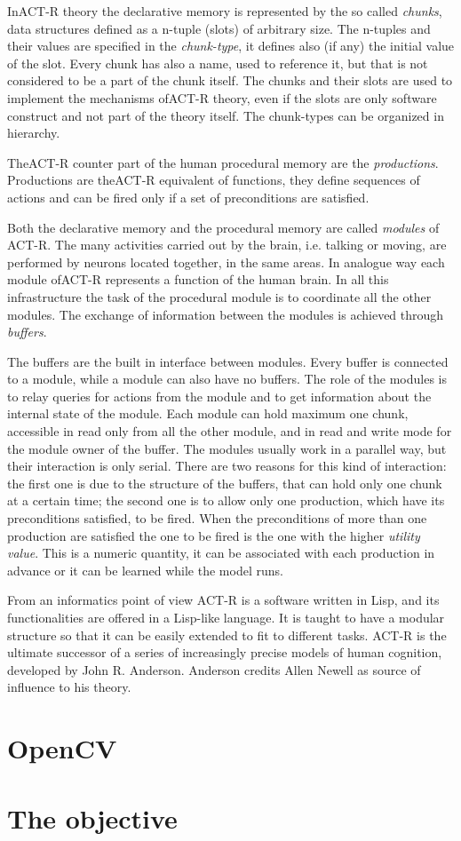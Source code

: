 In\mbox{ACT-R} theory the declarative memory is represented by the so called \emph{chunks}, data structures defined as a n-tuple (slots) of arbitrary size. The n-tuples and their values are specified in the \emph{chunk-type}, it defines also (if any) the initial value of the slot. Every chunk has also a name, used to reference it, but that is not considered to be a part of the chunk itself. The chunks and their slots are used to implement the mechanisms of\mbox{ACT-R} theory, even if the slots are only software construct and not part of the theory itself. The chunk-types can be organized in hierarchy.

The\mbox{ACT-R} counter part of the human procedural memory are the \emph{productions}. Productions are the\mbox{ACT-R} equivalent of functions, they define sequences of actions and can be fired only if a set of preconditions are satisfied. 

Both the declarative memory and the procedural memory are called \emph{modules} of \mbox{ACT-R}.  The many activities carried out by the brain, i.e. talking or moving, are performed by neurons located together, in the same areas. In analogue way each module of\mbox{ACT-R} represents a function of the human brain. In all this infrastructure the task of the procedural module is to coordinate all the other modules. The exchange of information between the modules is achieved through \emph{buffers}.

The buffers are the built in interface between modules. Every buffer is connected to a module, while a module can also have no buffers. The role of the modules is to relay queries for actions from the module and to get information about the internal state of the module. Each module can hold maximum one chunk, accessible in read only from all the other module, and in read and write mode for the module owner of the buffer. The modules usually work in a parallel way, but their interaction is only serial. There are two reasons for this kind of interaction: the first one is due to the structure of the buffers, that can hold only one chunk at a certain time; the second one is to allow only one production, which have its preconditions satisfied, to be fired. When the preconditions of more than one production are satisfied the one to be fired is the one with the higher \emph{utility value}. This is a numeric quantity, it can be associated with each production in advance or it can be learned while the model runs.

From an informatics point of view ACT-R is a software written in Lisp, and its functionalities are offered in a Lisp-like language. It is taught to have a modular structure so that it can be easily extended to fit to different tasks. ACT-R is the ultimate successor of a series of increasingly precise models of human cognition, developed by John R. Anderson. Anderson credits Allen Newell as source of influence to his theory.
\section{OpenCV}
\section{The objective}